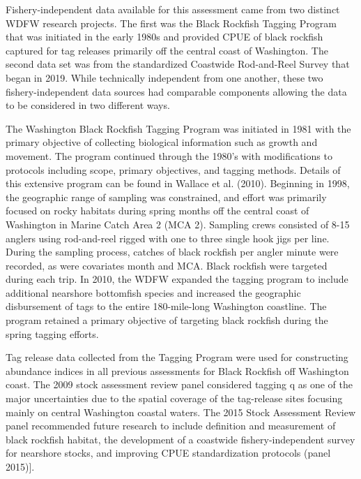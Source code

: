 \documentclass[11pt,
  english,
  letterpaper,
]{article}
\begin{document}
Fishery-independent data available for this assessment came from two distinct WDFW research projects. The first was the Black Rockfish Tagging Program that was initiated in the early 1980s and provided CPUE of black rockfish captured for tag releases primarily off the central coast of Washington. The second data set was from the standardized Coastwide Rod-and-Reel Survey that began in 2019. While technically independent from one another, these two fishery-independent data sources had comparable components allowing the data to be considered in two different ways.

The Washington Black Rockfish Tagging Program was initiated in 1981 with the primary objective of collecting biological information such as growth and movement. The program continued through the 1980's with modifications to protocols including scope, primary objectives, and tagging methods. Details of this extensive program can be found in Wallace et al. (2010). Beginning in 1998, the geographic range of sampling was constrained, and effort was primarily focused on rocky habitats during spring months off the central coast of Washington in Marine Catch Area 2 (MCA 2). Sampling crews consisted of 8-15 anglers using rod-and-reel rigged with one to three single hook jigs per line. During the sampling process, catches of black rockfish per angler minute were recorded, as were covariates month and MCA. Black rockfish were targeted during each trip. In 2010, the WDFW expanded the tagging program to include additional nearshore bottomfish species and increased the geographic disbursement of tags to the entire 180-mile-long Washington coastline. The program retained a primary objective of targeting black rockfish during the spring tagging efforts.

Tag release data collected from the Tagging Program were used for constructing abundance indices in all previous assessments for Black Rockfish off Washington coast. The 2009 stock assessment review panel considered tagging q as one of the major uncertainties due to the spatial coverage of the tag-release sites focusing mainly on central Washington coastal waters. The 2015 Stock Assessment Review panel recommended future research to include definition and measurement of black rockfish habitat, the development of a coastwide fishery-independent survey for nearshore stocks, and improving CPUE standardization protocols (panel 2015){]}.
\end{document}
